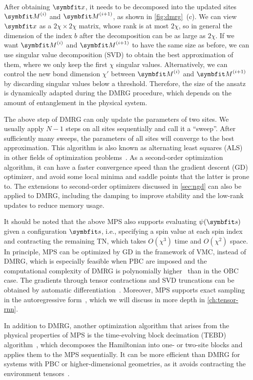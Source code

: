 After obtaining $\vx$, it needs to be decomposed into the updated sites $\mM^{(i)}$ and $\mM^{(i + 1)}$, as shown in \cref{fig:dmrg}~(c). We can view $\vx$ as a $2 \chi \times 2 \chi$ matrix, whose rank is at most $2 \chi$, so in general the dimension of the index $b$ after the decomposition can be as large as $2 \chi$. If we want $\mM^{(i)}$ and $\mM^{(i + 1)}$ to have the same size as before, we can use singular value decomposition (SVD) to obtain the best approximation of them, where we only keep the first $\chi$ singular values. Alternatively, we can control the new bond dimension $\chi'$ between $\mM^{(i)}$ and $\mM^{(i + 1)}$ by discarding singular values below a threshold. Therefore, the size of the ansatz is dynamically adapted during the DMRG procedure, which depends on the amount of entanglement in the physical system.

The above step of DMRG can only update the parameters of two sites. We usually apply $N - 1$ steps on all sites sequentially and call it a ``sweep''. After sufficiently many sweeps, the parameters of all sites will converge to the best approximation. This algorithm is also known as alternating least squares (ALS) in other fields of optimization problems~\cite{comon2009tensor, dolgov2013corrected}. As a second-order optimization algorithm, it can have a faster convergence speed than the gradient descent (GD) optimizer, and avoid some local minima and saddle points that the latter is prone to. The extensions to second-order optimizers discussed in \cref{sec:ngd} can also be applied to DMRG, including the damping to improve stability and the low-rank updates to reduce memory usage.

It should be noted that the above MPS also supports evaluating $\psi(\vs)$ given a configuration $\vs$, i.e., specifying a spin value at each spin index and contracting the remaining TN, which takes $O(\chi^3)$ time and $O(\chi^2)$ space. In principle, MPS can be optimized by GD in the framework of VMC, instead of DMRG, which is especially feasible when PBC are imposed and the computational complexity of DMRG is polynomially higher~\cite{sandvik2007variational} than in the OBC case. The gradients through tensor contractions and SVD truncations can be obtained by automatic differentiation~\cite{liu2017gradient, liao2019differentiable}. Moreover, MPS supports exact sampling in the autoregressive form~\cite{ferris2012perfect, han2018unsupervised, wei2022sequential}, which we will discuss in more depth in \cref{ch:tensor-rnn}.

In addition to DMRG, another optimization algorithm that arises from the physical properties of MPS is the time-evolving block decimation (TEBD) algorithm~\cite{vidal2003efficient}, which decomposes the Hamiltonian into one- or two-site blocks and applies them to the MPS sequentially. It can be more efficient than DMRG for systems with PBC or higher-dimensional geometries, as it avoids contracting the environment tensors~\cite{jiang2008accurate}.

